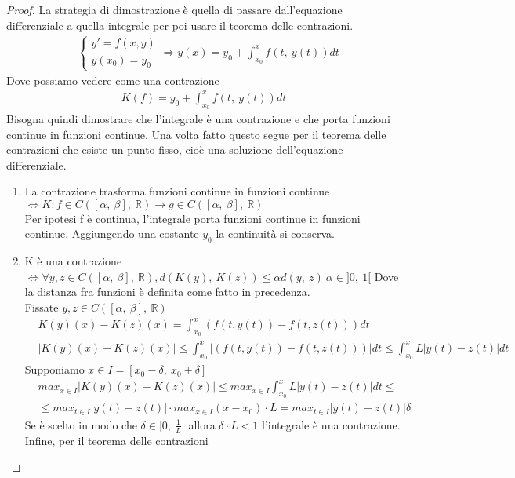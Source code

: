 \documentclass[10pt,a4paper]{article}
\newtheorem{proof}{Proof}
\begin{document}
\begin{proof}
	La strategia di dimostrazione è quella di passare dall'equazione differenziale a quella integrale per poi usare il teorema delle contrazioni.
	\begin{align*}
		&\begin{cases}
			y' = f(x,y)\\
			y(x_0)=y_0
		\end{cases}
	\Rightarrow y(x) = y_0 + \int_{x_0}^{x} f(t,\ y(t))dt
	\end{align*}	
	Dove possiamo vedere come una contrazione
	\begin{align*}
	K(f) = y_0 + \int_{x_0}^{x} f(t,\ y(t))dt
	\end{align*}
	Bisogna quindi dimostrare che l'integrale è una contrazione e che porta funzioni continue in funzioni continue. Una volta fatto questo segue per il teorema delle contrazioni che esiste un punto fisso, cioè una soluzione dell'equazione differenziale.
	\begin{enumerate}
		\item La contrazione trasforma funzioni continue in funzioni continue\\
		 \(\Leftrightarrow K: f\in C([\alpha,\ \beta],\ \mathbb{R})\to g\in C([\alpha,\ \beta],\ \mathbb{R})\)\\
		Per ipotesi f è continua, l'integrale porta funzioni continue in funzioni continue. Aggiungendo una costante \(y_0\) la continuità si conserva. 
		\item K è una contrazione\(\Leftrightarrow \forall y,z \in C([\alpha,\ \beta],\ \mathbb{R}), d(K(y),\ K(z))\leq\alpha d(y,\ z)\ \alpha \in ]0,\ 1[ \)
		Dove la distanza fra funzioni è definita come fatto in precedenza.\\
		Fissate \(y, z \in C([\alpha,\ \beta],\ \mathbb{R})\)
		\begin{align*}
			&K(y)(x)-K(z)(x)=\int_{x_0}^{x}\left(f(t,y(t))-f(t,z(t))\right)dt\\
			&|K(y)(x)-K(z)(x)| \leq \int_{x_0}^{x}|\left(f(t,y(t))-f(t,z(t))\right)|dt\leq \int_{x_0}^{x}L|y(t)-z(t)|dt
		\end{align*}
		Supponiamo \(x\in I = [x_0-\delta,\ x_0+\delta]\)
		\begin{align*}
			&max_{x\in I}|K(y)(x)-K(z)(x)|\leq max_{x\in I}\int_{x_0}^{x}L|y(t)-z(t)|dt\leq\\
			&\leq max_{t\in I}|y(t)-z(t)|\cdot max_{x\in I}(x-x_0)\cdot L=max_{t\in I}|y(t)-z(t)|\delta 
		\end{align*}
		Se è scelto in modo che $\delta\in ]0,\ \frac{1}{L}[ $ allora \(\delta\cdot L < 1\) l'integrale è una contrazione. Infine, per il teorema delle contrazioni

\end{enumerate}
\end{proof}
\end{document}
